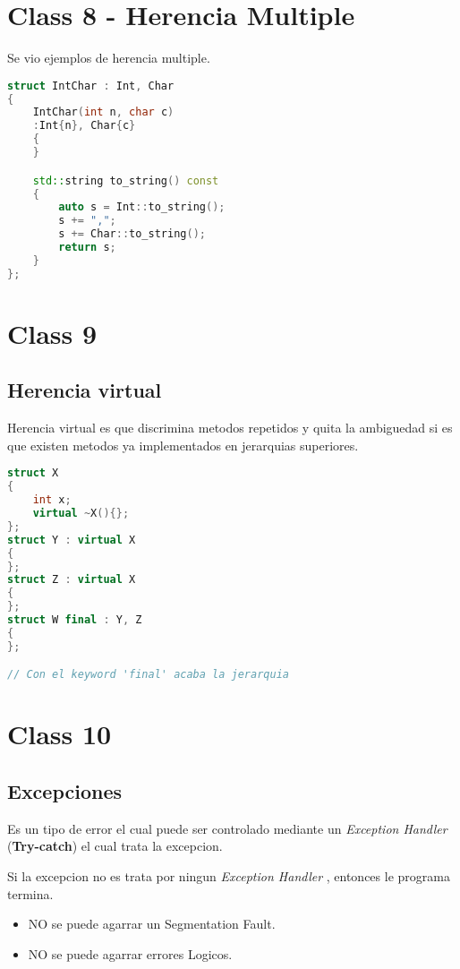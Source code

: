 \documentclass[11pt,letterpaper]{article}
\begin{document}
\section{Class 8 - Herencia Multiple}
Se vio ejemplos de herencia multiple.

\begin{lstlisting}[language=C++, caption={Herencia multiple}]
struct IntChar : Int, Char
{
    IntChar(int n, char c)
    :Int{n}, Char{c}
    {
    }

    std::string to_string() const
    {
        auto s = Int::to_string();
        s += ",";
        s += Char::to_string();
        return s;
    }
};
\end{lstlisting}

\section{Class 9}
\subsection{Herencia virtual}
Herencia virtual es que discrimina metodos repetidos y quita la ambiguedad
si es que existen metodos ya implementados en jerarquias superiores.
\begin{lstlisting}[language=C++, caption={Herencia virtual}]
struct X
{
    int x;
    virtual ~X(){};
};
struct Y : virtual X
{
};
struct Z : virtual X
{
};
struct W final : Y, Z
{
};

// Con el keyword 'final' acaba la jerarquia
\end{lstlisting}


\section{Class 10}
\subsection{Excepciones}
Es un tipo de error el cual puede ser controlado mediante un
\textit{Exception Handler} (\textbf{Try-catch}) el cual trata la excepcion.\par
Si la excepcion no es trata por ningun \textit{Exception Handler} , entonces le programa termina.
\begin{itemize}
    \item NO se puede agarrar un Segmentation Fault.
    \item NO se puede agarrar errores Logicos.
\end{itemize}
\end{document}
